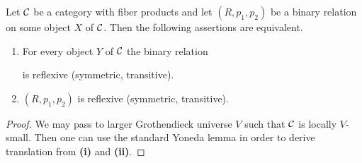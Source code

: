 \begin{fact}\label{fact:relationsintermsofpoints}
Let ${\mathcal C}$ be a category with fiber products and let $(R,p_1,p_2)$ be a binary relation on some object $X$ of ${\mathcal C}$. Then the following assertions are equivalent.
\begin{enumerate}[label=\emph{\textbf{(\roman*)}}, leftmargin=1.5em]
\item For every object $Y$ of ${\mathcal C}$ the binary relation
\begin{center}
\end{center}
is reflexive (symmetric, transitive).
\item $(R,p_1,p_2)$ is reflexive (symmetric, transitive).
\end{enumerate}
\end{fact}
\begin{proof}
We may pass to larger Grothendieck universe $V$ such that ${\mathcal C}$ is locally $V$-small. Then one can use the standard Yoneda lemma in order to derive translation from \textbf{(i)} and \textbf{(ii)}.
\end{proof}

